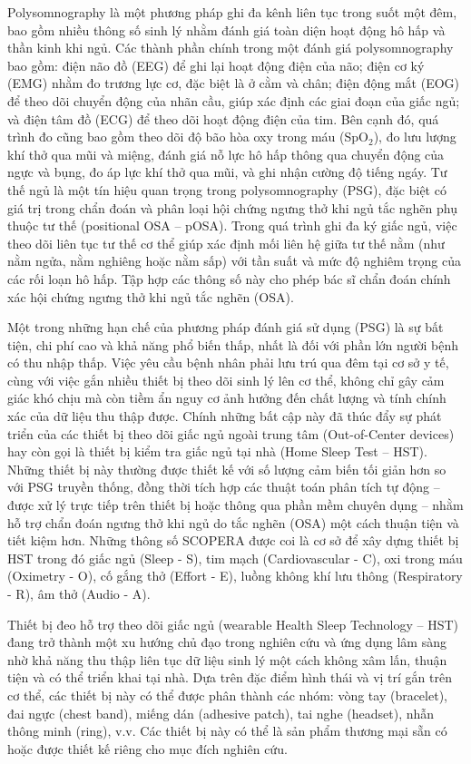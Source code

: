 Polysomnography là một phương pháp ghi đa kênh liên tục trong suốt một đêm, 
bao gồm nhiều thông số sinh lý nhằm đánh giá toàn diện hoạt động hô hấp và 
thần kinh khi ngủ. Các thành phần chính trong một đánh giá polysomnography 
bao gồm: điện não đồ (EEG) để ghi lại hoạt động điện của não; 
điện cơ ký (EMG) nhằm đo trương lực cơ, 
đặc biệt là ở cằm và chân; điện động mắt (EOG) để theo dõi chuyển động của nhãn cầu, 
giúp xác định các giai đoạn của giấc ngủ; và điện tâm đồ (ECG) để theo dõi hoạt động điện của tim. 
Bên cạnh đó, quá trình đo cũng bao gồm theo dõi độ bão hòa oxy trong máu (SpO$_2$), 
đo lưu lượng khí thở qua mũi và miệng, đánh giá nỗ lực hô hấp thông qua chuyển động của ngực và bụng, 
đo áp lực khí thở qua mũi, và ghi nhận cường độ tiếng ngáy. 
Tư thế ngủ là một tín hiệu quan trọng trong polysomnography (PSG), 
đặc biệt có giá trị trong chẩn đoán và phân loại hội chứng ngưng thở khi 
ngủ tắc nghẽn phụ thuộc tư thế (positional OSA – pOSA). 
Trong quá trình ghi đa ký giấc ngủ, việc theo dõi liên tục tư thế cơ thể giúp xác định mối liên hệ giữa tư thế nằm 
(như nằm ngửa, nằm nghiêng hoặc nằm sấp) với tần suất và mức độ nghiêm trọng của các rối loạn hô hấp. 
Tập hợp các thông số này cho phép bác sĩ chẩn đoán chính xác hội chứng ngưng thở khi ngủ tắc nghẽn (OSA).

Một trong những hạn chế của phương pháp đánh giá sử dụng (\gls{PSG}) là sự bất tiện, 
chi phí cao và khả năng phổ biến thấp, nhất là đối với phần lớn người bệnh có thu nhập thấp. 
Việc yêu cầu bệnh nhân phải lưu trú qua đêm tại cơ sở y tế, cùng với việc gắn nhiều thiết bị 
theo dõi sinh lý lên cơ thể, không chỉ gây cảm giác khó chịu mà còn tiềm ẩn nguy 
cơ ảnh hưởng đến chất lượng và tính chính xác của dữ liệu thu thập được. 
Chính những bất cập này đã thúc đẩy sự phát triển của các thiết bị theo dõi giấc 
ngủ ngoài trung tâm (Out-of-Center devices) hay còn gọi là thiết bị kiểm tra giấc ngủ tại nhà (Home Sleep Test – HST). 
Những thiết bị này thường được thiết kế với số lượng cảm biến tối giản hơn so với 
PSG truyền thống, đồng thời tích hợp các thuật toán phân tích tự động – được xử lý trực tiếp trên thiết bị 
hoặc thông qua phần mềm chuyên dụng – nhằm hỗ trợ chẩn đoán ngưng thở khi ngủ do tắc nghẽn (OSA) 
một cách thuận tiện và tiết kiệm hơn. Những thông số SCOPERA được coi là cơ sở để xây dựng thiết bị HST trong đó giấc ngủ (Sleep - S), tim mạch (Cardiovascular - C), oxi trong máu (Oximetry - O), cố gắng thở (Effort - E), 
luồng không khí lưu thông (Respiratory - R), âm thở (Audio - A).

Thiết bị đeo hỗ trợ theo dõi giấc ngủ (wearable Health Sleep Technology – HST) 
đang trở thành một xu hướng chủ đạo trong nghiên cứu và ứng dụng lâm 
sàng nhờ khả năng thu thập liên tục dữ liệu sinh lý một cách không xâm 
lấn, thuận tiện và có thể triển khai tại nhà. 
Dựa trên đặc điểm hình thái và vị trí gắn trên cơ thể, 
các thiết bị này có thể được phân thành các nhóm: 
vòng tay (bracelet), đai ngực (chest band), miếng dán (adhesive patch), 
tai nghe (headset), nhẫn thông minh (ring), v.v. 
Các thiết bị này có thể là sản phẩm thương mại sẵn có hoặc được thiết kế riêng cho mục đích nghiên cứu.

